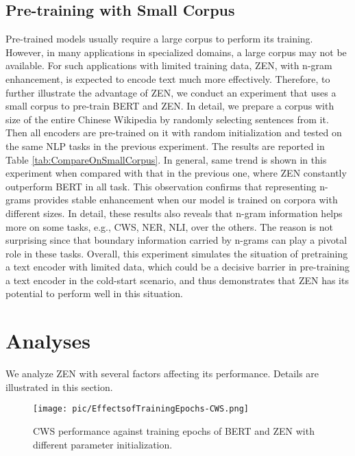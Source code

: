 \documentclass[11pt,a4paper]{article}
\begin{document}
\begin{CJK}{UTF8}{gbsn}
\subsection{Pre-training with Small Corpus}
Pre-trained models usually require a large corpus to perform its training. However, in many applications in specialized domains, a large corpus may not be available. For such applications with limited training data, ZEN, with n-gram enhancement, is expected to encode text much more effectively.
Therefore,
to further illustrate the advantage of ZEN,
we conduct an experiment that uses a small corpus to pre-train BERT and ZEN.
In detail, we prepare a corpus with  size of the entire Chinese Wikipedia 
by randomly selecting sentences from it.
Then all encoders are pre-trained on it with random initialization and tested on the same NLP tasks in the previous experiment.
The results are reported in Table \ref{tab:CompareOnSmallCorpus}.
In general, same trend is shown in this experiment when compared with that in the previous one,
where ZEN constantly outperform BERT in all task.
This observation confirms that representing n-grams provides stable enhancement when our model is trained on corpora with different sizes.
In detail, these results also reveals that n-gram information helps more on some tasks, e.g., CWS, NER, NLI, over the others.
The reason is not surprising since that boundary information carried by n-grams can play a pivotal role in these tasks.
Overall,
this experiment simulates the situation of pretraining a text encoder with limited data, which could be a decisive barrier in pre-training a text encoder in the cold-start scenario,
and thus demonstrates that ZEN has its potential to perform well in this situation.






\section{Analyses}
We analyze ZEN
with several factors affecting its performance.
Details are illustrated in this section.


\begin{figure}[t]
	\begin{center}
		\texttt{[image: pic/EffectsofTrainingEpochs-CWS.png]}
        \caption{CWS performance against training epochs of BERT and ZEN with different parameter initialization.}
        \label{CWS performance against Training Epochs}
	\end{center}
	\vspace{-2.0em}
\end{figure}


\end{CJK}
\end{document}

